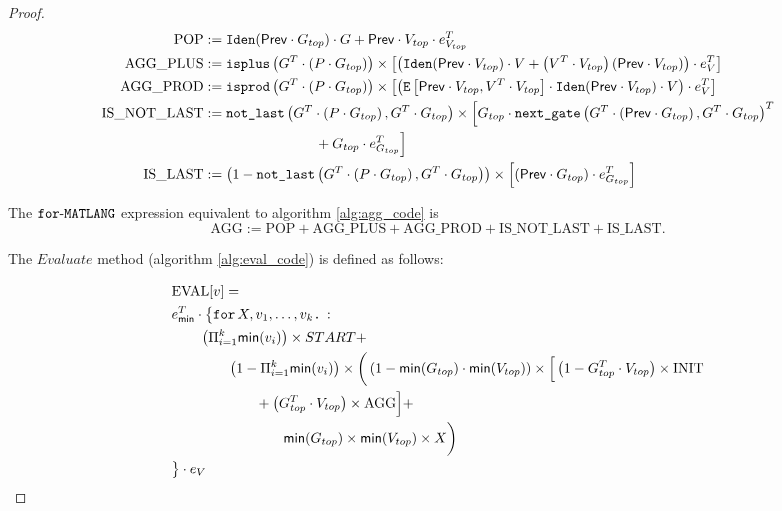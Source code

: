 \begin{proof}
    \begin{align*}
        \text{POP} &:= \texttt{Iden}(\mathsf{Prev}\cdot G_{top})\cdot G + \mathsf{Prev}\cdot V_{top}\cdot e_{V_{top}}^T  \\
        \text{AGG{\_}PLUS} &:= \texttt{isplus}\left( G^T \cdot \left( P \cdot G_{top}\right) \right) \times \left[ \left( \texttt{Iden}(\mathsf{Prev}\cdot V_{top}) \cdot V + \left( V^T \cdot V_{top} \right)\left( \mathsf{Prev}\cdot V_{top} \right)\right) \cdot e_{V}^T \right] \\
        \text{AGG{\_}PROD} &:= \texttt{isprod}\left(G^T \cdot \left( P \cdot G_{top}\right) \right) \times \left[ \left( \texttt{E}\left[ \mathsf{Prev}\cdot V_{top}, V^T \cdot V_{top} \right] \cdot \texttt{Iden}(\mathsf{Prev}\cdot V_{top}) \cdot V \right) \cdot e_{V}^T \right] \\
        \text{IS{\_}NOT{\_}LAST} &:= \texttt{not{\_}last}\left(G^T \cdot \left( P \cdot G_{top}\right),G^T \cdot G_{top} \right) \times \Big[  G_{top} \cdot \texttt{next{\_}gate}\left(G^T \cdot \left( \mathsf{Prev}\cdot G_{top} \right) , G^T \cdot G_{top} \right)^T \\
        &\hspace{8em}+ G_{top}\cdot e_{G_{top}}^T \Big] \\
        \text{IS{\_}LAST} &:= \left( 1 - \texttt{not{\_}last}\left(G^T \cdot \left( P \cdot G_{top}\right),G^T \cdot G_{top} \right) \right)\times \left[ \left( \mathsf{Prev}\cdot G_{top} \right) \cdot e_{G_{top}}^T \right]
    \end{align*}

    The $\texttt{for}\text{-}\texttt{MATLANG}$ expression equivalent to algorithm \ref{alg:agg_code} is $$\text{AGG}:=\text{POP} + \text{AGG{\_}PLUS}+\text{AGG{\_}PROD}+\text{IS{\_}NOT{\_}LAST}+\text{IS{\_}LAST}.$$

    The $Evaluate$ method (algorithm \ref{alg:eval_code}) is defined as follows:

    \begin{align*}
        &\text{EVAL}[v]= \\
        &e_{\mathsf{min}}^T \cdot \big\lbrace \texttt{for}\, X,v_1, \ldots, v_k \texttt{.}\, : \\
        &\hspace{2em}\left( \Pi_{i=1}^k \mathsf{min}(v_i)\right) \times START + \\
        &\hspace{4em}\left( 1- \Pi_{i=1}^k \mathsf{min}(v_i)\right) \times \bigg( \left(1 - \mathsf{min}(G_{top})\cdot \mathsf{min}(V_{top}) \right) \times \Big[ \left( 1 - G_{top}^T\cdot V_{top} \right) \times \text{INIT} \\
        &\hspace{6em}+ \left(  G_{top}^T\cdot V_{top} \right) \times \text{AGG} \Big] + \\
        &\hspace{8em}\mathsf{min}(G_{top})\times \mathsf{min}(V_{top})\times X\bigg) \\ 
        &\big\rbrace\cdot e_{V}
    \end{align*}


\end{proof}
